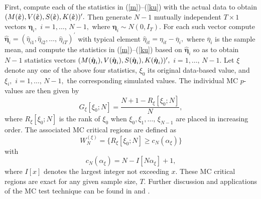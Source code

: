 \documentclass[11pt]{article}
\begin{document}
First, compute each of the statistics in (\ref{m})--(\ref{ku}) with the
actual data to obtain $(M(\hat{\boldsymbol{\varepsilon }}),V(\hat{%
\boldsymbol{\varepsilon }}),S(\hat{\boldsymbol{\varepsilon }}),K(\hat{%
\boldsymbol{\varepsilon }}))^{\prime }.$ Then generate $N-1$ mutually
independent $T\times 1$ vectors $\boldsymbol{\eta }_{i},$ $i=1,\ldots ,\,N-1,
$ where $\boldsymbol{\eta }_{i}\sim N(0,I_{T}).$ For each such vector
compute $\hat{\boldsymbol{\eta }}_{i}=(\hat{\eta}_{i1},\hat{\eta}%
_{i2},\ldots ,\,\hat{\eta}_{iT})^{\prime }$ with typical element $\hat{\eta}%
_{it}=\eta _{it}-\overline{\eta }_{i},$ where $\overline{\eta }_{i}$ is the
sample mean, and compute the statistics in (\ref{m})--(\ref{ku}) based on $%
\hat{\boldsymbol{\eta }}_{i}$ so as to obtain $N-1$ statistics vectors $(M(%
\hat{\boldsymbol{\eta }}_{i}),V(\hat{\boldsymbol{\eta }}_{i}),S(\hat{%
\boldsymbol{\eta }}_{i}),K(\hat{\boldsymbol{\eta }}_{i}))^{\prime },$ $%
i=1,\ldots ,\,N-1.$ Let $\xi $ denote any one of the above four statistics, $%
\xi _{0}$ its original data-based value, and $\xi _{i},$ $i=1,\ldots ,\,N-1,$
the corresponding simulated values. The individual MC $p$-values are then
given by 
\begin{equation}
G_{\xi }[\xi _{0};N]=\frac{N+1-R_{\xi }[\xi _{0};N]}{N},  \label{p-value}
\end{equation}%
where $R_{\xi }[\xi _{0};N]$ is the rank of $\xi _{0}$ when $\xi _{0},\xi
_{1},\ldots ,\,\xi _{N-1}$ are placed in increasing order. The associated MC
critical regions are defined as 
\begin{equation*}
W_{N}^{(\xi )}=\big\{R_{\xi }[\xi _{0};N]\geq c_{N}(\alpha _{\xi })\big\}
\end{equation*}%
with 
\begin{equation*}
c_{N}(\alpha _{\xi })=N-I[N\alpha _{\xi }]+1,
\end{equation*}%
where $I[x]$ denotes the largest integer not exceeding $x$. These MC
critical regions are exact for any given sample size, $T$. Further
discussion and applications of the MC test technique can be found in %
\citet{Dufour-Khalaf:2001} and \citet{Dufour:2006}.
\end{document}
